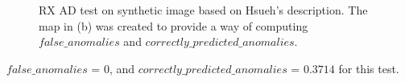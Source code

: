 \begin{figure}[H]
\begin{minipage}[]{.5\linewidth}
\end{minipage}


\caption{RX AD test on synthetic image based on Hsueh's description. The map in (b) was created to provide a way of computing $false\_anomalies$ and $ correctly\_predicted\_anomalies$.  }
\label{fig:hsueh_image_RX_test}
\end{figure}

$false\_anomalies$ = 0, and  $correctly\_predicted\_anomalies$ = $0.3714$ for this test.

